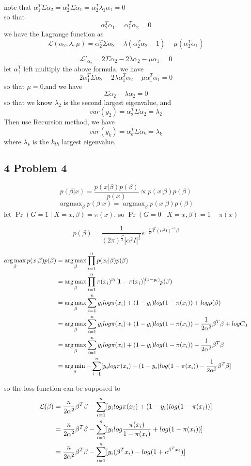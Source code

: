 \documentclass[10pt,a4paper]{article}
\begin{document}
note that $ \alpha_1^T\Sigma\alpha_2 = \alpha_2^T\Sigma\alpha_1 =\alpha_2^T\lambda_1\alpha_1=0 $ \\
so that 
\[ \alpha_2^T\alpha_1=\alpha_1^T\alpha_2=0 \]
we have the Lagrange function as 
\[ \mathcal{L}(\alpha_2, \lambda, \mu)= \alpha_2^T \Sigma \alpha_2 - \lambda(\alpha_2^T\alpha_2 - 1 ) - \mu(\alpha_2^T\alpha_1) \]

\[ \mathcal{L}'_{\alpha_2}= 2\Sigma \alpha_2 - 2\lambda \alpha_2 - \mu\alpha_1=0 \]
let $\alpha_1^T$ left multiply the above formula, we have
\[ 2\alpha_1^T \Sigma \alpha_2 - 2\lambda\alpha_1^T \alpha_2 - \mu\alpha_1^T\alpha_1=0 \]
so that $\mu=0$,and we have
\[ \Sigma\alpha_2-\lambda\alpha_2=0 \]
so that we know $\lambda_2$ is the second largest eigenvalue, and 
\[ var(y_2)=\alpha_2^T \Sigma \alpha_2=\lambda_2 \]
Then use Recursion method, we have
\[ var(y_k)=\alpha_k^T \Sigma \alpha_k=\lambda_k \]
where $ \lambda_k $ is the $k_{th}$ largest eigenvalue.

\subsection{4 Problem 4}
\[ p(\beta|x)=\frac{p(x|\beta)p(\beta)}{p(x)} \propto p(x|\beta)p(\beta) \] 
\[ \mathop{\arg\max}_{\beta}p(\beta|x)=\mathop{\arg\max}_{\beta} p(x|\beta)p(\beta) \] 
let $\operatorname{Pr}(G=1 \mid X=x, \beta) = \pi(x)$, so $\operatorname{Pr}(G=0 \mid X=x, \beta) = 1- \pi(x)$

$$ p(\beta)=\frac{1}{(2\pi)^\frac{P}{2}{|\alpha^2I|}^\frac{1}{2}}e^{-\frac{1}{2}\beta^T{(\alpha^2I)}^{-1}\beta} $$

\begin{align}
	\mathop{\arg\max}_{\beta} p(x|\beta)p(\beta)
	& = \mathop{\arg\max}_{\beta} \prod_{i=1}^{n}p(x_i|\beta)p(\beta) \notag \\
	& = \mathop{\arg\max}_{\beta} \prod_{i=1}^{n}{\pi(x_i)}^{y_i}[1-\pi(x_i)]^{(1-y_i)}p(\beta) \notag \\
	& = \mathop{\arg\max}_{\beta}\sum_{i=1}^{n}y_i log\pi(x_i)+(1-y_i)log(1-\pi(x_i))+logp(\beta)	\notag \\
	& = \mathop{\arg\max}_{\beta}\sum_{i=1}^{n}y_i log\pi(x_i)+(1-y_i)log(1-\pi(x_i))-\frac{1}{2\alpha^2}\beta^T\beta+logC_0	\notag \\
	& = \mathop{\arg\max}_{\beta}\sum_{i=1}^{n}y_i log\pi(x_i)+(1-y_i)log(1-\pi(x_i))-\frac{1}{2\alpha^2}\beta^T\beta	\notag \\
	& = \mathop{\arg\min}_{\beta}-\sum_{i=1}^{n}[y_i log\pi(x_i)+(1-y_i)log(1-\pi(x_i))-\frac{1}{2\alpha^2}\beta^T\beta]	\notag
\end{align}

so the loss function can be supposed to
\begin{align}
\mathcal{L}(\beta)
& = \frac{n}{2\alpha^2}\beta^T\beta-\sum_{i=1}^{n}[y_i log\pi(x_i)+(1-y_i)log(1-\pi(x_i))] \notag \\
& = \frac{n}{2\alpha^2}\beta^T\beta-\sum_{i=1}^{n}[y_i log\frac{\pi(x_i)}{1-\pi(x_i)}+log(1-\pi(x_i))]	\notag \\
& = \frac{n}{2\alpha^2}\beta^T\beta -\sum_{i=1}^{n}[y_i (\beta^Tx_i)-log(1+e^{\beta^Tx_i})]	\notag 
\end{align}
\end{document}

